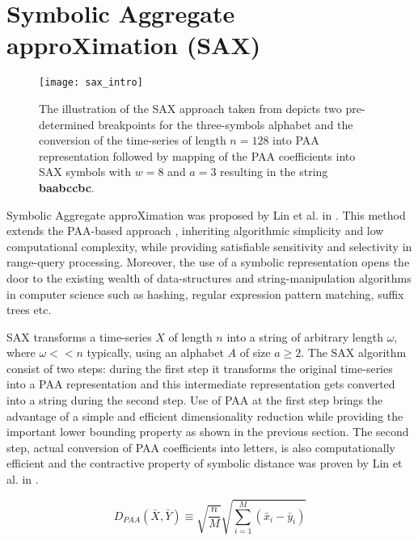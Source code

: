 \section{Symbolic Aggregate approXimation (SAX)} \label{sax}
\begin{figure}[tbp]
   \centering
   \texttt{[image: sax\_intro]}
   \caption{The illustration of the SAX approach taken from \cite{citeulike:2821475} depicts two pre-determined breakpoints for the three-symbols alphabet and the conversion of the time-series of length $n=128$ into PAA representation followed by mapping of the PAA coefficients into SAX symbols with $w=8$ and $a=3$ resulting in the string \textbf{baabccbc}.}
   \label{fig:sax_intro}
\end{figure}

Symbolic Aggregate approXimation was proposed by Lin et al. in \cite{citeulike:2821475}. This method extends the PAA-based approach \cite{citeulike:2946589} \cite{citeulike:3000416}, inheriting algorithmic simplicity and low computational complexity, while providing satisfiable sensitivity and selectivity in range-query processing. Moreover, the use of a symbolic representation opens the door to the existing wealth of data-structures and string-manipulation algorithms in computer science such as hashing, regular expression pattern matching, suffix trees etc.

SAX transforms a time-series $X$ of length $n$ into a string of arbitrary length $\omega$, where $\omega << n$ typically, using an alphabet $A$ of size $ a \geq 2$. The SAX algorithm consist of two steps: during the first step it transforms the original time-series into a PAA representation and this intermediate representation gets converted into a string during the second step. Use of PAA at the first step brings the advantage of a simple and efficient dimensionality reduction while providing the important lower bounding property as shown in the previous section. The second step, actual conversion of PAA coefficients into letters, is also computationally efficient and the contractive property of symbolic distance was proven by Lin et al. in \cite{citeulike:532335}.

\begin{equation}
D_{PAA}(\bar{X}, \bar{Y}) \equiv \sqrt{\frac{n}{M}} \sqrt{ \sum_{i=1}^{M} 
\left(  \bar{x}_{i} - \bar{y}_{i} \right)}
\label{eq:paa_distance}
\end{equation}

